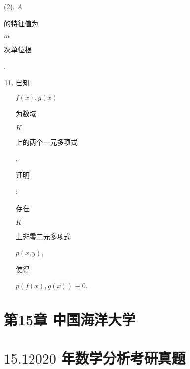 \documentclass[10pt]{article}
\begin{document}
(2). $A$ \begin{CJK}{UTF8}{mj}的特征值为\end{CJK} $m$ \begin{CJK}{UTF8}{mj}次单位根\end{CJK}.

\begin{enumerate}
  \setcounter{enumi}{10}
  \item \begin{CJK}{UTF8}{mj}已知\end{CJK} $f(x), g(x)$ \begin{CJK}{UTF8}{mj}为数域\end{CJK} $K$ \begin{CJK}{UTF8}{mj}上的两个一元多项式\end{CJK}, \begin{CJK}{UTF8}{mj}证明\end{CJK}: \begin{CJK}{UTF8}{mj}存在\end{CJK} $K$ \begin{CJK}{UTF8}{mj}上非零二元多项式\end{CJK} $p(x, y)$, \begin{CJK}{UTF8}{mj}使得\end{CJK} $p(f(x), g(x)) \equiv 0$.
\end{enumerate}
\section{第15章 中国海洋大学}
\section{$15.12020$ 年数学分析考研真题}
\end{document}
